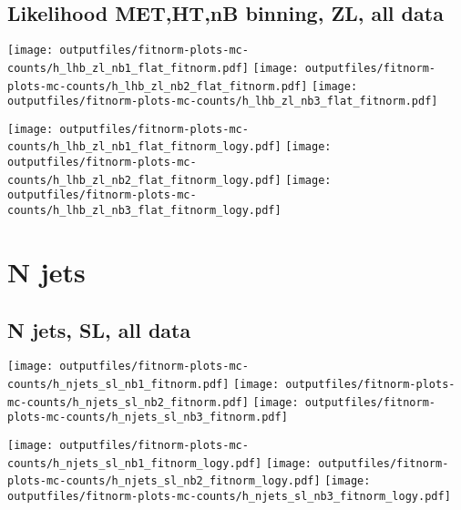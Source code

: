 \documentclass[11pt]{article}
\begin{document}
   \clearpage

    \subsection{ Likelihood MET,HT,nB binning, ZL, all data}

    \noindent
     \texttt{[image: outputfiles/fitnorm-plots-mc-counts/h\_lhb\_zl\_nb1\_flat\_fitnorm.pdf]}
     \texttt{[image: outputfiles/fitnorm-plots-mc-counts/h\_lhb\_zl\_nb2\_flat\_fitnorm.pdf]}
     \texttt{[image: outputfiles/fitnorm-plots-mc-counts/h\_lhb\_zl\_nb3\_flat\_fitnorm.pdf]}

    \noindent
     \texttt{[image: outputfiles/fitnorm-plots-mc-counts/h\_lhb\_zl\_nb1\_flat\_fitnorm\_logy.pdf]}
     \texttt{[image: outputfiles/fitnorm-plots-mc-counts/h\_lhb\_zl\_nb2\_flat\_fitnorm\_logy.pdf]}
     \texttt{[image: outputfiles/fitnorm-plots-mc-counts/h\_lhb\_zl\_nb3\_flat\_fitnorm\_logy.pdf]}

   \clearpage







  \clearpage
   \section{ N jets }

    \subsection{ N jets, SL, all data}

    \noindent
     \texttt{[image: outputfiles/fitnorm-plots-mc-counts/h\_njets\_sl\_nb1\_fitnorm.pdf]}
     \texttt{[image: outputfiles/fitnorm-plots-mc-counts/h\_njets\_sl\_nb2\_fitnorm.pdf]}
     \texttt{[image: outputfiles/fitnorm-plots-mc-counts/h\_njets\_sl\_nb3\_fitnorm.pdf]}

    \noindent
     \texttt{[image: outputfiles/fitnorm-plots-mc-counts/h\_njets\_sl\_nb1\_fitnorm\_logy.pdf]}
     \texttt{[image: outputfiles/fitnorm-plots-mc-counts/h\_njets\_sl\_nb2\_fitnorm\_logy.pdf]}
     \texttt{[image: outputfiles/fitnorm-plots-mc-counts/h\_njets\_sl\_nb3\_fitnorm\_logy.pdf]}
\end{document}
